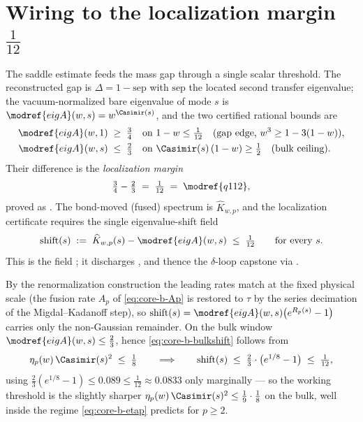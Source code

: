 \section{Wiring to the localization margin \texorpdfstring{$\tfrac1{12}$}{1/12}}
\label{sec:core-b-wiring}

The saddle estimate feeds the mass gap through a single scalar threshold.  The
reconstructed gap is $\Delta = 1-\mathrm{sep}$ with $\mathrm{sep}$ the located
second transfer eigenvalue; the vacuum-normalized bare eigenvalue of mode $s$ is
$\modref{eigA}(w,s)=w^{\Casimir(s)}$, and the two certified rational bounds are
\begin{align}
  \modref{eigA}(w,1) &\;\ge\; \tfrac34
    && \text{on } 1-w\le\tfrac1{12} \quad
      (\text{gap edge, }w^{3}\ge 1-3(1-w)),\label{eq:core-b-gapedge}\\
  \modref{eigA}(w,s) &\;\le\; \tfrac23
    && \text{on } \Casimir(s)\,(1-w)\ge\tfrac12 \quad
      (\text{bulk ceiling}).\label{eq:core-b-bulkceil}
\end{align}
Their difference is the \emph{localization margin}
\[
  \tfrac34 - \tfrac23 \;=\; \tfrac1{12} \;=\; \modref{q112},
\]
proved as .  The bond-moved
(fused) spectrum is $\widehat K_{w,p}$, and the localization certificate
 requires the single
eigenvalue-shift field
\begin{equation}
  \mathrm{shift}(s) \;:=\; \widehat K_{w,p}(s) - \modref{eigA}(w,s)
    \;\le\; \tfrac1{12}\qquad\text{for every }s.
  \label{eq:core-b-bulkshift}
\end{equation}
This is the field ; it
discharges , and thence the
$\delta$-loop capstone
 via
.

\begin{proposition}
\label{prop:core-b-target}
By the renormalization construction the leading rates match at the fixed physical
scale (the fusion rate $A_p$ of \eqref{eq:core-b-Ap} is restored to $\tau$ by the
series decimation of the Migdal--Kadanoff step), so
$\mathrm{shift}(s) = \modref{eigA}(w,s)\bigl(e^{R_p(s)}-1\bigr)$ carries only the
non-Gaussian remainder.  On the bulk window $\modref{eigA}(w,s)\le\tfrac23$, hence
\eqref{eq:core-b-bulkshift} follows from
\[
  \eta_p(w)\,\Casimir(s)^{2} \;\le\; \tfrac18
  \qquad\Longrightarrow\qquad
  \mathrm{shift}(s) \;\le\; \tfrac23\cdot\bigl(e^{1/8}-1\bigr) \;\le\; \tfrac1{12},
\]
using $\tfrac23(e^{1/8}-1)\le 0.089\le\tfrac1{12}\approx 0.0833$ only marginally —
so the working threshold is the slightly sharper
$\eta_p(w)\,\Casimir(s)^{2}\le\tfrac1{9}\cdot\tfrac18$ on the bulk, well inside the
regime \eqref{eq:core-b-etap} predicts for $p\ge 2$.
\end{proposition}

